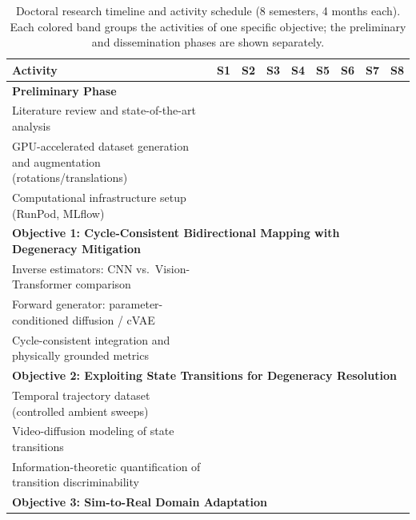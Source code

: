 \documentclass[letterpaper, 12, one column]{article}
\renewcommand{\arraystretch}{1.15}
\begin{document}
\begin{table}[H]
\centering
\footnotesize
\caption{Doctoral research timeline and activity schedule (8 semesters, 4 months each). Each colored band groups the activities of one specific objective; the preliminary and dissemination phases are shown separately.}
\label{tab:timeline}
\renewcommand{\arraystretch}{1.4}
\begin{tabular}{|p{5.9cm}|c|c|c|c|c|c|c|c|}
\hline
\textbf{Activity} & \textbf{S1} & \textbf{S2} & \textbf{S3} & \textbf{S4} & \textbf{S5} & \textbf{S6} & \textbf{S7} & \textbf{S8} \\
\hline
\multicolumn{9}{|l|}{\textbf{Preliminary Phase}} \\
\hline
Literature review and state-of-the-art analysis & \cellcolor{blue!25} & \cellcolor{blue!25} & & & & & & \\
\hline
GPU-accelerated dataset generation and augmentation (rotations/translations) & \cellcolor{blue!25} & \cellcolor{blue!25} & & & & & & \\
\hline
Computational infrastructure setup (RunPod, MLflow) & \cellcolor{blue!25} & & & & & & & \\
\hline
\multicolumn{9}{|l|}{\textbf{Objective 1: Cycle-Consistent Bidirectional Mapping with Degeneracy Mitigation}} \\
\hline
Inverse estimators: CNN vs.\ Vision-Transformer comparison & & \cellcolor{green!30} & \cellcolor{green!30} & & & & & \\
\hline
Forward generator: parameter-conditioned diffusion / cVAE & & & \cellcolor{green!30} & \cellcolor{green!30} & & & & \\
\hline
Cycle-consistent integration and physically grounded metrics & & & & \cellcolor{green!30} & \cellcolor{green!30} & & & \\
\hline
\multicolumn{9}{|l|}{\textbf{Objective 2: Exploiting State Transitions for Degeneracy Resolution}} \\
\hline
Temporal trajectory dataset (controlled ambient sweeps) & & & & \cellcolor{teal!30} & \cellcolor{teal!30} & & & \\
\hline
Video-diffusion modeling of state transitions & & & & & \cellcolor{teal!30} & \cellcolor{teal!30} & & \\
\hline
Information-theoretic quantification of transition discriminability & & & & & & \cellcolor{teal!30} & \cellcolor{teal!30} & \\
\hline
\multicolumn{9}{|l|}{\textbf{Objective 3: Sim-to-Real Domain Adaptation}} \\

\end{tabular}
\end{table}
\end{document}
